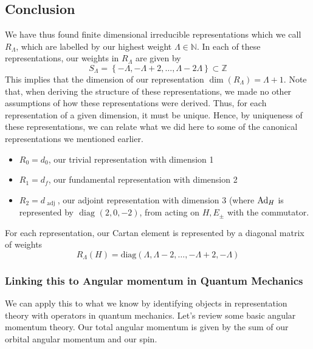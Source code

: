 \subsection{Conclusion}
We have thus found finite dimensional 
irreducible representations which we call  $R_{\Lambda}$, 
which are labelled by our highest weight $ \Lambda \in \mathbb{ N} $. 
In each of these representations, our weights in 
 $ R _{ \Lambda } $ are given by 
 \[
  S_{ \Lambda } = \left\{   - \Lambda, - \Lambda + 2 , \dots , \Lambda - 2 
  \Lambda \right\} \subset \mathbb{ Z}  
 \] This implies that the 
 dimension of our representation $ \dim ( R _{ \Lambda } ) = \Lambda + 1$. 
 Note that, when deriving the structure 
 of these representations, we made no other 
 assumptions of how these representations 
 were derived. Thus, for each representation of a given dimension, 
 it must be unique. Hence, by uniqueness of these representations, we can 
 relate what we did here to some of the canonical representations
 we mentioned earlier. 
\begin{itemize}
	\item $ R_0 = d_0 $, our trivial representation with dimension 1 
	\item $ R_1 = d_ f $, our fundamental representation with dimension 2 
	\item $ R_2 = d _\text{ adj } $, our adjoint representation with dimension 3 (where 
		$ \text{Ad} _ H  $ is represented by $ \text{ diag }( 2 , 0 , -2 ) $, from
		acting on $ H , E _ \pm $ with the commutator. 
\end{itemize} 
For each representation, 
our Cartan element is represented by a diagonal matrix 
of weights 
\[
 R_\Lambda ( H ) = \text{diag} ( \Lambda, \Lambda - 2, \dots , - \Lambda + 2, - \Lambda ) 
\]

\subsubsection{Linking this to Angular momentum in Quantum Mechanics} 
We can apply this to 
what we know by identifying objects in representation 
theory with operators in quantum mechanics. 
Let's review some basic angular momentum theory. 
Our total angular momentum is given by the sum of our 
orbital angular momentum and our spin. 

